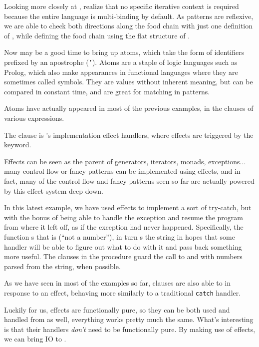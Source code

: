 
Looking more closely at \Law{}, realize that no specific iterative context is
required because the entire language is multi-binding by default. As patterns
are reflexive, we are able to check both directions along the food chain with
just one definition of , while defining the food chain using the
flat structure of .

Now may be a good time to bring up atoms, which take the form of identifiers
prefixed by an apostrophe (\texttt{'}). Atoms are a staple of logic languages
such as Prolog, which also make appearances in functional languages where
they are sometimes called symbols. They are values without inherent meaning,
but can be compared in constant time, and are great for matching in patterns.

Atoms have actually appeared in most of the previous examples, in the 
clauses of various expressions.


The  clause is \Trilogy{}'s implementation effect handlers, where
effects are triggered by the  keyword.

Effects can be seen as the parent of generators, iterators, monads,
exceptions... many control flow or fancy patterns can be implemented using
effects, and in fact, many of the control flow and fancy patterns seen so far
are actually powered by this effect system deep down.

In this latest example, we have used effects to implement a sort of try-catch,
but with the bonus of being able to handle the exception and resume the program
from where it left off, as if the exception had never happened. Specifically,
 the  function s that  is 
(``not a number''),  in turn s the string in hopes that
some handler will be able to figure out what to do with it and pass back something
more useful. The  clauses in the  procedure guard the call to
 and  with numbers parsed from the string, when possible.

As we have seen in most of the examples so far,  clauses are also able
to  in response to an effect, behaving more similarly to a traditional
\texttt{catch} handler.


Luckily for us, effects are functionally pure, so they can be both used and
handled from \Poetry{} as well, everything works pretty much the same. What's
interesting is that their handlers \emph{don't} need to be functionally pure.
By making use of effects, we can bring IO to \Poetry{}.

